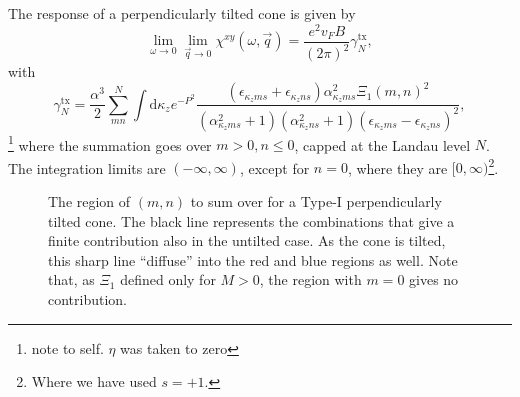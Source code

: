 \begin{summary}
  The response of a perpendicularly tilted cone is given by
  \begin{equation}
    \label{eq:136}
    \lim_{\omega \to 0} \lim_{\vec{q} \to 0} \chi^{xy}(\omega, \vec{q}) =
    \frac{e^2v_F B }{(2 \pi)^2 }
    \gamma^{\text{tx}}_N,
  \end{equation}
  with
  \begin{equation}
    \label{eq:137}
    \gamma^{\text{tx}}_N =
    \frac{\alpha^3}{2}
    \sum\limits_{mn}^{N}
    \int \mathrm{d}\kappa_z
    e^{-P^2}
    \frac{
      (\epsilon_{\kappa_z m s} + \epsilon_{\kappa_z n s})
      \alpha_{\kappa_z m s}^2 \Xi_1(m,n)^2
    }{
      (\alpha_{\kappa_z m s}^2 + 1)(\alpha_{\kappa_z n s}^2 + 1)
      (\epsilon_{\kappa_z m s} - \epsilon_{\kappa_z ns})^2
    },
  \end{equation}
  \footnote{note to self. \( \eta \) was taken to zero}
  where the summation goes over \( m > 0, n \leq 0 \), capped at the Landau level \( N \).
  The integration limits are \( (-\infty, \infty) \), except for \( n = 0 \), where they are \( [0, \infty) \)\footnote{Where we have used \( s=+1 \).}.
\end{summary}


\begin{figure}[ht]
  \centering
  \caption{The region of \( (m,n) \) to sum over for a Type-I perpendicularly tilted cone.
    The black line represents the combinations that give a finite contribution also in the untilted case.
    As the cone is tilted, this sharp line ``diffuse'' into the red and blue regions as well.
    Note that, as \( \Xi_1 \) defined only for \( M>0\), the region with \( m=0 \) gives no contribution.}
  \label{fig:nmregion}
\end{figure}

